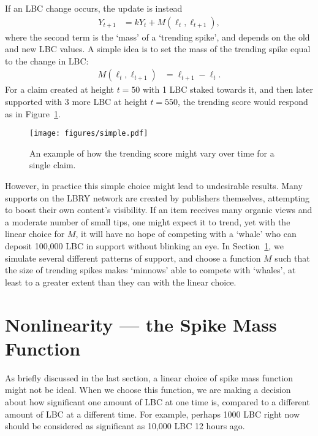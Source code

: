\documentclass[a4paper, 12pt]{article}
\begin{document}
If an LBC change occurs, the update is instead
\begin{align}
Y_{t+1} &= kY_t + M(\ell_t, \ell_{t+1}), \label{eqn:decay_with_spike}
\end{align}
where the second term is the `mass' of a `trending spike', and depends on
the old and new LBC values. A simple idea is to set the mass of the trending
spike equal to the change in LBC:
\begin{align}
M(\ell_t, \ell_{t+1}) &= \ell_{t+1} - \ell_t.
\end{align}
For a claim created at height $t=50$ with 1 LBC staked towards it, and then
later supported with 3 more LBC at height $t=550$, the trending score
would respond as in Figure~\ref{fig:simple}.

\begin{figure}[!ht]
\centering
\texttt{[image: figures/simple.pdf]}
\caption{An example of how the trending score might vary over time
for a single claim.\label{fig:simple}}
\end{figure}

However, in practice this simple choice might lead to undesirable results.
Many supports on the LBRY network are created by publishers themselves,
attempting to boost their own content's visibility. If an item receives
many organic views and a moderate number of small tips, one might expect it
to trend, yet with the linear choice for $M$, it will have no hope of
competing with a `whale' who can deposit 100,000 LBC in support without
blinking an eye. In Section~\ref{sec:spike_mass}, we simulate several
different patterns of support, and choose a function $M$ such that
the size of trending spikes makes `minnows' able to compete with `whales',
at least to a greater extent than they can with the linear choice.

\section{Nonlinearity --- the Spike Mass Function}\label{sec:spike_mass}
As briefly discussed in the last section, a linear choice of spike mass
function might not be ideal. When we choose this function, we are making
a decision about how significant one amount of LBC at one time is, compared
to a different amount of LBC at a different time. For example, perhaps
1000 LBC right now should be considered as
significant as 10,000 LBC 12 hours ago.
\end{document}

